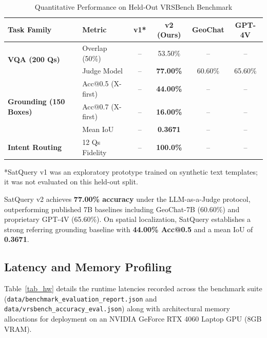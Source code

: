 \documentclass[lettersize,journal]{IEEEtran}
\begin{document}
\begin{table}[h]
\centering
\caption{Quantitative Performance on Held-Out VRSBench Benchmark}
\label{tab_perf}
\begin{tabular}{llcccc}
\toprule
\textbf{Task Family} & \textbf{Metric} & \textbf{v1*} & \textbf{v2 (Ours)} & \textbf{GeoChat} & \textbf{GPT-4V} \\
\midrule
\multirow{2}{*}{\textbf{VQA (200 Qs)}} 
 & Overlap (50\%) & -- & 53.50\% & -- & -- \\
 & Judge Model    & -- & \textbf{77.00\%} & 60.60\% & 65.60\% \\
\midrule
\multirow{3}{*}{\textbf{Grounding (150 Boxes)}} 
 & Acc@0.5 (X-first) & -- & \textbf{44.00\%} & -- & -- \\
 & Acc@0.7 (X-first) & -- & \textbf{16.00\%} & -- & -- \\
 & Mean IoU          & -- & \textbf{0.3671}  & -- & -- \\
\midrule
\textbf{Intent Routing} & 12 Qs Fidelity & -- & \textbf{100.0\%} & -- & -- \\
\bottomrule
\end{tabular}
\vspace{1mm}
\raggedright \footnotesize{*SatQuery v1 was an exploratory prototype trained on synthetic text templates; it was not evaluated on this held-out split.}
\end{table}

SatQuery v2 achieves \textbf{77.00\% accuracy} under the LLM-as-a-Judge protocol, outperforming published 7B baselines including GeoChat-7B (60.60\%) and proprietary GPT-4V (65.60\%). On spatial localization, SatQuery establishes a strong referring grounding baseline with \textbf{44.00\% Acc@0.5} and a mean IoU of \textbf{0.3671}.

\subsection{Latency and Memory Profiling}
Table~\ref{tab_hw} details the runtime latencies recorded across the benchmark suite (\texttt{data/benchmark\_evaluation\_report.json} and \texttt{data/vrsbench\_accuracy\_eval.json}) along with architectural memory allocations for deployment on an NVIDIA GeForce RTX 4060 Laptop GPU (8GB VRAM).
\end{document}
